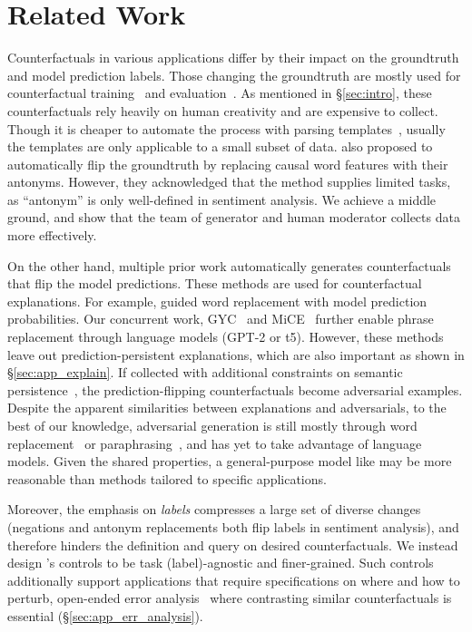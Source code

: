 \section{Related Work}
\label{sec:relate}

Counterfactuals in various applications differ by their impact on the groundtruth and model prediction labels.
Those changing the groundtruth are mostly used for counterfactual training~\cite{kaushik2019learning, teney2020learning} and evaluation~\cite{gardner2020contrast, checklist:acl20}.
As mentioned in \S\ref{sec:intro}, these counterfactuals rely heavily on human creativity and are expensive to collect.
Though it is cheaper to automate the process with parsing templates~\cite{li2020linguistically}, usually the templates are only applicable to a small subset of data.
\citet{wang2020robustness} also proposed to automatically flip the groundtruth by replacing causal word features with their antonyms.
However, they acknowledged that the method supplies limited tasks, as ``antonym'' is only well-defined in sentiment analysis.
We achieve a middle ground, and show that the team of \sysname generator and human moderator collects data more effectively.

On the other hand, multiple prior work automatically generates counterfactuals that flip the model predictions.
These methods are used for counterfactual explanations.
For example, \citet{kang2020counterfactual} guided word replacement with model prediction probabilities.
Our concurrent work, GYC~\cite{madaan2020generate} and MiCE~\cite{ross2020explaining} further enable phrase replacement through language models (GPT-2 or t5).
However, these methods leave out prediction-persistent explanations, which are also important as shown in \S\ref{sec:app_explain}.
If collected with additional constraints on semantic persistence~\cite{morris2020textattack, alzantot-etal-2018-generating}, the prediction-flipping counterfactuals become adversarial examples.
Despite the apparent similarities between explanations and adversarials, to the best of our knowledge, adversarial generation is still mostly through word replacement~\cite{alzantot2018generating, garg2020bae, li2020contextualized} or paraphrasing~\cite{iyyer2018adversarial, malandrakis-etal-2019-controlled}, and has yet to take advantage of language models.
Given the shared properties, a general-purpose model like \sysname may be more reasonable than methods tailored to specific applications.

Moreover, the emphasis on \emph{labels} compresses a large set of diverse changes (\eg negations and antonym replacements both flip labels in sentiment analysis), and therefore hinders the definition and query on desired counterfactuals.
We instead design \sysname's controls to be task (label)-agnostic and finer-grained.
Such controls additionally support applications that require specifications on where and how to perturb, \eg open-ended error analysis~\cite{wu2019errudite} where contrasting similar counterfactuals is essential (\S\ref{sec:app_err_analysis}).


